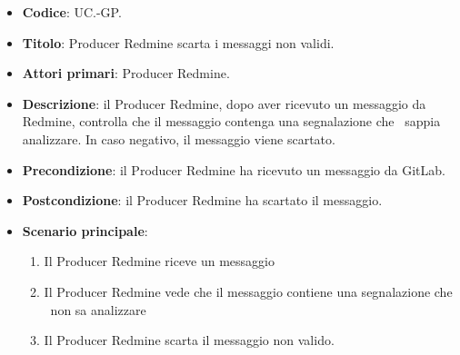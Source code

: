 	\begin{itemize}
		\item \textbf{Codice}: UC\theuccount.\thesubuccount-GP.
		\item \textbf{Titolo}: Producer Redmine scarta i messaggi non validi.
		\item \textbf{Attori primari}: Producer Redmine.
		\item \textbf{Descrizione}: il Producer Redmine, dopo aver ricevuto un messaggio da Redmine, controlla
		che il messaggio contenga una segnalazione che \progetto\ sappia analizzare. In caso negativo, il messaggio viene scartato.
		\item \textbf{Precondizione}: il Producer Redmine ha ricevuto un messaggio da GitLab.
		\item \textbf{Postcondizione}: il Producer Redmine ha scartato il messaggio.
		\item \textbf{Scenario principale}: 
		\begin{enumerate}
			\item Il Producer Redmine riceve un messaggio
			\item Il Producer Redmine vede che il messaggio contiene una segnalazione che \progetto\ non sa analizzare
			\item Il Producer Redmine scarta il messaggio non valido.
		\end{enumerate}
	\end{itemize}